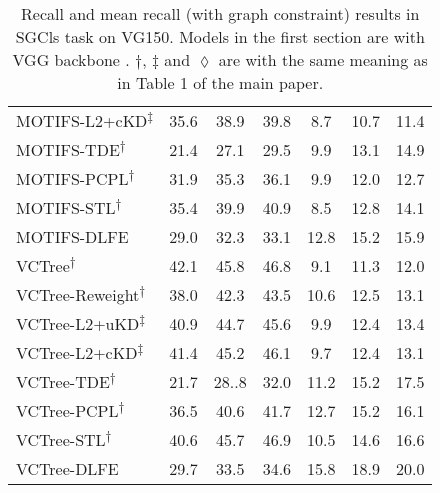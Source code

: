 \documentclass[sigconf]{acmart}
\begin{document}
\begin{table*}[htbp]
{\begin{tabular}{l|c c c c c c}
MOTIFS-L2+cKD\textsuperscript{$\ddagger$} \cite{DBLP:conf/bmvc/WangPL20} & 35.6 & 38.9 & 39.8 & 8.7 & 10.7 & 11.4 \\
MOTIFS-TDE\textsuperscript{$\dagger$} \cite{tang2020unbiased} & 21.4 & 27.1 & 29.5 & 9.9 & 13.1 & 14.9 \\
MOTIFS-PCPL\textsuperscript{$\dagger$} \cite{yan2020pcpl} & 31.9 & 35.3 & 36.1 & 9.9 & 12.0 & 12.7 \\
MOTIFS-STL\textsuperscript{$\dagger$} \cite{chen2019soft} & 35.4 & 39.9 & 40.9 & 8.5 & 12.8 & 14.1 \\
MOTIFS-DLFE & 29.0 & 32.3 & 33.1 & 12.8 & 15.2 & 15.9 \\
\hline
VCTree\textsuperscript{$\dagger$} \cite{tang2019learning,tang2020unbiased} & 42.1 & 45.8 & 46.8 & 9.1 & 11.3 & 12.0 \\
VCTree-Reweight\textsuperscript{$\dagger$} & 38.0 & 42.3 & 43.5 & 10.6 & 12.5 & 13.1 \\
VCTree-L2+uKD\textsuperscript{$\ddagger$} \cite{DBLP:conf/bmvc/WangPL20} & 40.9 & 44.7 & 45.6 & 9.9 & 12.4 & 13.4 \\ 
VCTree-L2+cKD\textsuperscript{$\ddagger$} \cite{DBLP:conf/bmvc/WangPL20} & 41.4 & 45.2 & 46.1 & 9.7 & 12.4 & 13.1 \\ 
VCTree-TDE\textsuperscript{$\dagger$} \cite{tang2020unbiased} & 21.7 & 28..8 & 32.0 & 11.2 & 15.2 & 17.5 \\
VCTree-PCPL\textsuperscript{$\dagger$} \cite{yan2020pcpl} & 36.5 & 40.6 & 41.7 & 12.7 & 15.2 & 16.1 \\
VCTree-STL\textsuperscript{$\dagger$} \cite{chen2019soft} & 40.6 & 45.7 & 46.9 & 10.5 & 14.6 & 16.6 \\
VCTree-DLFE & 29.7 & 33.5 & 34.6 & 15.8 & 18.9 & 20.0 \\
\hline
\end{tabular}
}
\vspace{0.1em}
\caption{Recall and mean recall (with graph constraint) results in SGCls task on VG150. 
Models in the first section are with VGG backbone \cite{simonyan2014very}.
$\dagger$, $\ddagger$ and $\lozenge$ are with the same meaning as in Table 1 of the main paper.
}
\label{tab:sgg_result_sgcls}
\end{table*}
\end{document}

